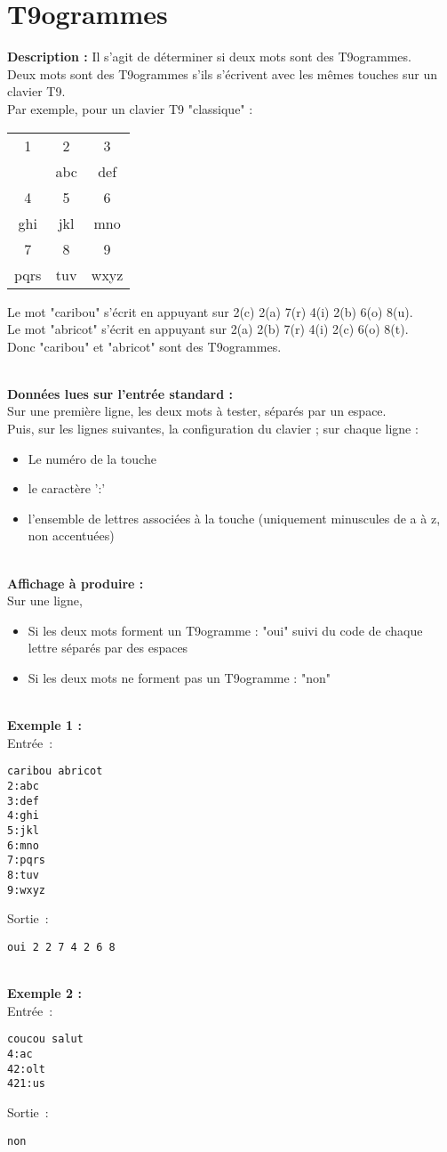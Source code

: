 \documentclass[10pt]{article}
\begin{document}
\section*{T9ogrammes}
\noindent
\textbf{Description :}  Il s'agit de déterminer si deux mots sont des T9ogrammes.\\
Deux mots sont des T9ogrammes s'ils s'écrivent avec les mêmes touches sur un clavier T9.\\
Par exemple, pour un clavier T9 "classique" :
\begin{center}
\begin{tabular}{|c|c|c|}
\hline
 1 & 2 & 3\\
 & abc & def\\
\hline
 4 & 5 & 6\\
 ghi & jkl & mno\\
\hline
 7 & 8 & 9\\
 pqrs & tuv & wxyz\\
\hline
\end{tabular}
\end{center}

\noindent
Le mot "caribou" s'écrit en appuyant sur 2(c) 2(a) 7(r) 4(i) 2(b) 6(o) 8(u).\\
Le mot "abricot" s'écrit en appuyant sur 2(a) 2(b) 7(r) 4(i) 2(c) 6(o) 8(t).\\
Donc "caribou" et "abricot" sont des T9ogrammes.

~\\
\textbf{Données lues sur l'entrée standard :}\\
Sur une première ligne, les deux mots à tester, séparés par un espace.\\
Puis, sur les lignes suivantes, la configuration du clavier ; sur chaque ligne :
\begin{itemize}
\item Le numéro de la touche
\item le caractère ':'
\item l'ensemble de lettres associées à la touche (uniquement minuscules de a à z, non accentuées)
\end{itemize}
~\\
\textbf{Affichage à produire :}\\
Sur une ligne,
\begin{itemize}
\item Si les deux mots forment un T9ogramme : "oui" suivi du code de chaque lettre séparés par des espaces
\item Si les deux mots ne forment pas un T9ogramme : "non"
\end{itemize}
~\\
\noindent
\textbf{Exemple 1 :}\\
\noindent
Entrée~:
\begin{verbatim}
caribou abricot
2:abc
3:def
4:ghi
5:jkl
6:mno
7:pqrs
8:tuv
9:wxyz
\end{verbatim}

\noindent
Sortie~:
\begin{verbatim}
oui 2 2 7 4 2 6 8
\end{verbatim}
~\\
\noindent
\textbf{Exemple 2 :}\\
\noindent
Entrée~:
\begin{verbatim}
coucou salut
4:ac
42:olt
421:us
\end{verbatim}

\noindent
Sortie~:
\begin{verbatim}
non
\end{verbatim}
\end{document}
